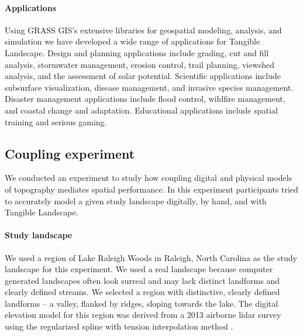 \documentclass[prodmode,acmtochi]{acmsmall} %
\begin{document}
\paragraph{Applications}
Using GRASS GIS's extensive libraries for geospatial modeling, analysis, and simulation 
we have developed a wide range of applications for Tangible Landscape.
%
Design and planning applications include
grading, cut and fill analysis, stormwater management, erosion control, 
trail planning, viewshed analysis, and the assessment of solar potential. 
%
Scientific applications include
subsurface visualization, disease management, and invasive species management.
%
Disaster management applications include 
flood control, wildfire management, and coastal change and adaptation. 
%
Educational applications include
spatial training and serious gaming.



\subsection{Coupling experiment}
We conducted an experiment to study how coupling digital and physical models of topography mediates spatial performance. 
%
In this experiment %
participants tried to accurately model a given study landscape 
digitally, by hand, and with Tangible Landscape. 

\paragraph{Study landscape}
We used a region of Lake Raleigh Woods in Raleigh, North Carolina 
as the study landscape for this experiment. 
%
We used a real landscape because computer generated landscapes 
often look surreal and may lack distinct landforms and clearly defined streams. 
%
We selected a region with distinctive, 
clearly defined landforms -- a valley, flanked by ridges, sloping towards the lake.
%
The digital elevation model for this region was derived from a 2013 airborne lidar survey using the regularized spline with tension interpolation method \cite{Mitasova2005}. 
\end{document}
